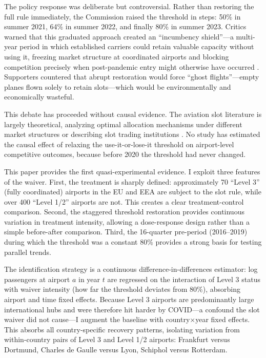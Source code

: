 \documentclass[12pt]{article}
\begin{document}
The policy response was deliberate but controversial. Rather than restoring the full rule immediately, the Commission raised the threshold in steps: 50\% in summer 2021, 64\% in summer 2022, and finally 80\% in summer 2023. Critics warned that this graduated approach created an ``incumbency shield''---a multi-year period in which established carriers could retain valuable capacity without using it, freezing market structure at coordinated airports and blocking competition precisely when post-pandemic entry might otherwise have occurred \citep{iata2021slots}. Supporters countered that abrupt restoration would force ``ghost flights''---empty planes flown solely to retain slots---which would be environmentally and economically wasteful.

This debate has proceeded without causal evidence. The aviation slot literature is largely theoretical, analyzing optimal allocation mechanisms under different market structures \citep{brueckner2002, brueckner2009, verhoef2010, basso2007} or describing slot trading institutions \citep{gillen2006, fukui2014}. No study has estimated the causal effect of relaxing the use-it-or-lose-it threshold on airport-level competitive outcomes, because before 2020 the threshold had never changed.

This paper provides the first quasi-experimental evidence. I exploit three features of the waiver. First, the treatment is sharply defined: approximately 70 ``Level 3'' (fully coordinated) airports in the EU and EEA are subject to the slot rule, while over 400 ``Level 1/2'' airports are not. This creates a clear treatment-control comparison. Second, the staggered threshold restoration provides continuous variation in treatment intensity, allowing a dose-response design rather than a simple before-after comparison. Third, the 16-quarter pre-period (2016--2019) during which the threshold was a constant 80\% provides a strong basis for testing parallel trends.

The identification strategy is a continuous difference-in-differences estimator: log passengers at airport $a$ in year $t$ are regressed on the interaction of Level 3 status with waiver intensity (how far the threshold deviates from 80\%), absorbing airport and time fixed effects. Because Level 3 airports are predominantly large international hubs and were therefore hit harder by COVID---a confound the slot waiver did not cause---I augment the baseline with country$\times$year fixed effects. This absorbs all country-specific recovery patterns, isolating variation from within-country pairs of Level 3 and Level 1/2 airports: Frankfurt versus Dortmund, Charles de Gaulle versus Lyon, Schiphol versus Rotterdam.
\end{document}
